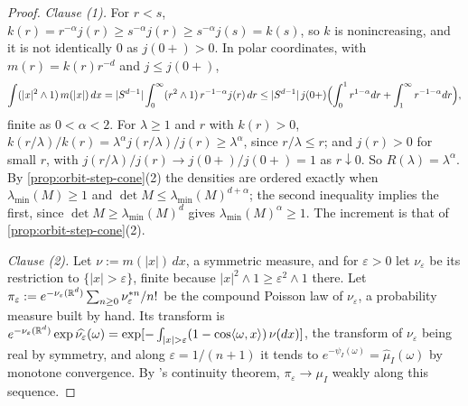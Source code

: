 \begin{proof}
\leanok
\emph{Clause (1).} For $r < s$, $k(r) = r^{-\alpha}j(r) \ge s^{-\alpha}j(r) \ge s^{-\alpha}j(s) = k(s)$,
so $k$ is nonincreasing, and it is not identically $0$ as $j(0{+}) > 0$. In polar coordinates, with
$m(r) = k(r)r^{-d}$ and $j \le j(0{+})$,
\[
  \int(|x|^2 \wedge 1)\,m(|x|)\,dx = |S^{d-1}|\int_0^\infty(r^2 \wedge 1)\,r^{-1-\alpha}j(r)\,dr
  \le |S^{d-1}|\,j(0{+})\Bigl(\int_0^1r^{1-\alpha}dr + \int_1^\infty r^{-1-\alpha}dr\Bigr) ,
\]
finite as $0 < \alpha < 2$. For $\lambda \ge 1$ and $r$ with $k(r) > 0$,
$k(r/\lambda)/k(r) = \lambda^\alpha j(r/\lambda)/j(r) \ge \lambda^\alpha$, since $r/\lambda \le r$;
and $j(r) > 0$ for small $r$, with $j(r/\lambda)/j(r) \to j(0{+})/j(0{+}) = 1$ as $r \downarrow 0$.
So $R(\lambda) = \lambda^\alpha$. By \ref{prop:orbit-step-cone}(2) the densities are ordered exactly
when $\lambda_{\min}(M) \ge 1$ and $\det M \le \lambda_{\min}(M)^{d+\alpha}$; the second inequality implies the
first, since $\det M \ge \lambda_{\min}(M)^d$ gives $\lambda_{\min}(M)^\alpha \ge 1$. The increment is that of
\ref{prop:orbit-step-cone}(2).

\emph{Clause (2).} Let $\nu := m(|x|)\,dx$, a symmetric measure, and for $\varepsilon > 0$ let
$\nu_\varepsilon$ be its restriction to $\{|x| > \varepsilon\}$, finite because
$|x|^2 \wedge 1 \ge \varepsilon^2 \wedge 1$ there. Let
$\pi_\varepsilon := e^{-\nu_\varepsilon(\mathbb{R}^d)}\sum_{n\ge0}\nu_\varepsilon^{*n}/n!$ be the compound
Poisson law of $\nu_\varepsilon$, a probability measure built by hand. Its transform is
$e^{-\nu_\varepsilon(\RR^d)}\exp\widehat{\nu_\varepsilon}(\omega) =
\exp[-\int_{|x|>\varepsilon}(1 - \cos\langle\omega,x\rangle)\,\nu(dx)]$, the transform of
$\nu_\varepsilon$ being real by symmetry, and along $\varepsilon = 1/(n+1)$ it tends to
$e^{-\psi_I(\omega)} = \widehat\mu_I(\omega)$ by monotone convergence. By \Levy{}'s continuity theorem,
$\pi_\varepsilon \to \mu_I$ weakly along this sequence.


\end{proof}
